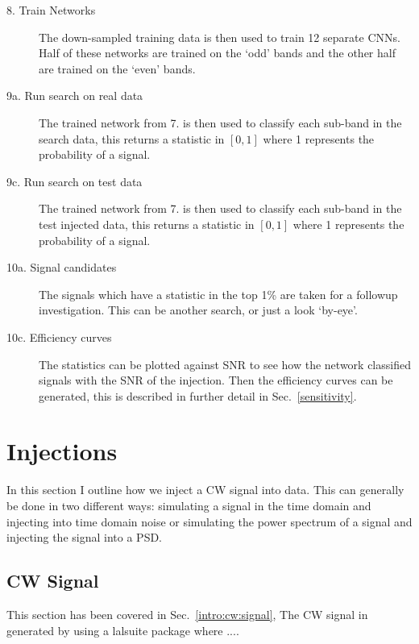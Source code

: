 \begin{description}
    \item[8. Train Networks] The down-sampled training data is then used to train 12 separate \acp{CNN}. Half of these networks are trained on the `odd' bands and the other half are trained on the `even' bands. 

    \item[9a. Run search on real data] The trained network from 7. is then used to classify each sub-band in the search data, this returns a statistic in $[0,1]$ where 1 represents the probability of a signal. 
    
    \item[9c. Run search on test data] The trained network from 7. is then used to classify each sub-band in the test injected data, this returns a statistic in $[0,1]$ where 1 represents the probability of a signal. 
    
    \item[10a. Signal candidates] The signals which have a statistic in the top 1\% are taken for a followup investigation. This can be another search, or just a look `by-eye'.
    
    \item[10c. Efficiency curves] The statistics can be plotted against \ac{SNR} to see how the network classified signals with the \ac{SNR} of the injection. Then the efficiency curves can be generated, this is described in further detail in Sec.~\ref{sensitivity}.
    

  
\end{description}



\section{Injections}
In this section I outline how we inject a \ac{CW} signal into data. This can generally be done in two different ways: simulating a signal in the time domain and injecting into time domain noise or simulating the power spectrum of a signal and injecting the signal into a \ac{PSD}.
\subsection{CW Signal}
This section has been covered in Sec.~\ref{intro:cw:signal}, The CW signal in generated by using a lalsuite package where ....

